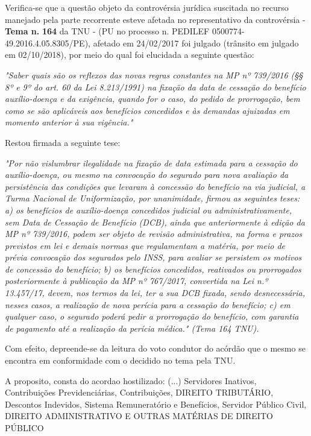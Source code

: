 \documentclass[12pt]{article}
\begin{document}
\justifying
\noindent Verifica-se que a questão objeto da controvérsia jurídica suscitada no recurso manejado pela parte recorrente esteve afetada no representativo da controvérsia - \textbf{Tema n. }\textbf{164} da TNU - (PU no processo n. PEDILEF 0500774-49.2016.4.05.8305/PE),  afetado em 24/02/2017 foi julgado (trânsito em julgado em 02/10/2018), por meio do qual foi elucidada a seguinte questão:

\noindent \textit{"Saber quais são os reflexos das novas regras constantes na MP nº 739/2016 (§§ 8º e 9º do art. 60 da Lei 8.213/1991) na fixação da data de cessação do benefício auxílio-doença e da exigência, quando for o caso, do pedido de prorrogação, bem como se são aplicáveis aos benefícios concedidos e às demandas ajuizadas em momento anterior à sua vigência."}

\noindent Restou firmada a seguinte tese:

\noindent \textit{"Por não vislumbrar ilegalidade na fixação de data estimada para a cessação do auxílio-doença, ou mesmo na convocação do segurado para nova avaliação da persistência das condições que levaram à concessão do benefício na via judicial, a Turma Nacional de Uniformização, por unanimidade, firmou as seguintes teses: a) os benefícios de auxílio-doença concedidos judicial ou administrativamente, sem Data de Cessação de Benefício (DCB), ainda que anteriormente à edição da MP nº 739/2016, podem ser objeto de revisão administrativa, na forma e prazos previstos em lei e demais normas que regulamentam a matéria, por meio de prévia convocação dos segurados pelo INSS, para avaliar se persistem os motivos de concessão do benefício; b) os benefícios concedidos, reativados ou prorrogados posteriormente à publicação da MP nº 767/2017, convertida na Lei n.º 13.457/17, devem, nos termos da lei, ter a sua DCB fixada, sendo desnecessária, nesses casos, a realização de nova perícia para a cessação do benefício; c) em qualquer caso, o segurado poderá pedir a prorrogação do benefício, com garantia de pagamento até a realização da perícia médica." (Tema 164 TNU).}

\noindent Com efeito, depreende-se da leitura do voto condutor do acórdão que o mesmo se encontra em conformidade com o decidido no  tema pela TNU.

\noindent A proposito, consta do acordao hostilizado: (...) Servidores Inativos, Contribuições Previdenciárias, Contribuições, DIREITO TRIBUTÁRIO, Descontos Indevidos, Sistema Remuneratório e Benefícios, Servidor Público Civil, DIREITO ADMINISTRATIVO E OUTRAS MATÉRIAS DE DIREITO PÚBLICO
\end{document}
